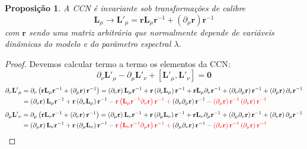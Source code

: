 \documentclass[25pt]{article}
\numberwithin{equation}{subsection} %
\newtheorem{propo}{Proposição}
\newcommand{\commutador}[2]{\left[#1,#2\right]}
\begin{document}
\begin{propo}
	A CCN é invariante sob transformações de calibre $$\mathbf{L}_{\mu}\to {\mathbf{L}'}_{\mu}=\mathbf{r}\mathbf{L}_{\mu}\mathbf{r}^{-1}+\left(\partial_\mu\mathbf{r}\right)\mathbf{r}^{-1}$$
	com $\mathbf{r}$ sendo uma matriz arbitrária que normalmente depende de variáveis dinâmicas do modelo e do parâmetro espectral $\lambda$.
\end{propo}
\begin{proof}
	Devemos calcular termo a termo os elementos da CCN:
	\begin{equation}
	\partial_\nu{\mathbf{L}'}_{\mu}-\partial_\mu{\mathbf{L}'}_{\nu}+\commutador{{\mathbf{L}'}_\mu}{{\mathbf{L}'}_{\nu}}=\mathbf{0}
	\end{equation}
	\begin{align}
	\partial_\nu{\mathbf{L}'}_\mu&=\partial_\nu\left(\mathbf{r}\mathbf{L}_{\mu}\mathbf{r}^{-1}+\left(\partial_\mu\mathbf{r}\right)\mathbf{r}^{-1}\right)=\left(\partial_{\nu}\mathbf{r}\right)\mathbf{L}_\mu\mathbf{r}^{-1}+\mathbf{r}\left(\partial_\nu\mathbf{L}_\mu\right)\mathbf{r}^{-1}+\mathbf{r}\mathbf{L}_\mu\partial_\nu\mathbf{r}^{-1}+\left(\partial_\nu\partial_\mu\mathbf{r}\right)\mathbf{r}^{-1}+\left(\partial_\mu\mathbf{r}\right)\partial_\nu\mathbf{r}^{-1}\\
	&=\left(\partial_{\nu}\mathbf{r}\right)\mathbf{L}_\mu\mathbf{r}^{-1}+\mathbf{r}\left(\partial_\nu\mathbf{L}_\mu\right)\mathbf{r}^{-1}-\color{red} \mathbf{r}\left(\mathbf{L}_\mu\mathbf{r}^{-1}\partial_\nu\mathbf{r}\right)\mathbf{r}^{-1}+\color{black}\left(\partial_\nu\partial_\mu\mathbf{r}\right)\mathbf{r}^{-1}-\color{red}\left(\partial_\mu\mathbf{r}\right)\mathbf{r}^{-1}\left(\partial_\nu\mathbf{r}\right)\mathbf{r}^{-1}\color{black}
	\end{align}
		\begin{align}
	\partial_\mu{\mathbf{L}'}_\nu&=\partial_\mu\left(\mathbf{r}\mathbf{L}_{\nu}\mathbf{r}^{-1}+\left(\partial_\nu\mathbf{r}\right)\mathbf{r}^{-1}\right)=\left(\partial_{\mu}\mathbf{r}\right)\mathbf{L}_\nu\mathbf{r}^{-1}+\mathbf{r}\left(\partial_\mu\mathbf{L}_\nu\right)\mathbf{r}^{-1}+\mathbf{r}\mathbf{L}_\nu\partial_\mu\mathbf{r}^{-1}+\left(\partial_\mu\partial_\nu\mathbf{r}\right)\mathbf{r}^{-1}+\left(\partial_\nu\mathbf{r}\right)\partial_\mu\mathbf{r}^{-1}\\
	&=\left(\partial_{\mu}\mathbf{r}\right)\mathbf{L}_\nu\mathbf{r}^{-1}+\mathbf{r}\left(\partial_\mu\mathbf{L}_\nu\right)\mathbf{r}^{-1}-\color{red} \mathbf{r}\left(\mathbf{L}_\nu\mathbf{r}^{-1}\partial_\mu\mathbf{r}\right)\mathbf{r}^{-1}+\color{black}\left(\partial_\mu\partial_\nu\mathbf{r}\right)\mathbf{r}^{-1}-\color{red}\left(\partial_\nu\mathbf{r}\right)\mathbf{r}^{-1}\left(\partial_\mu\mathbf{r}\right)\mathbf{r}^{-1}\color{black}

\end{align}
\end{proof}
\end{document}
